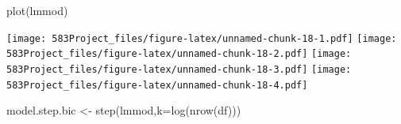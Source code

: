 \documentclass[
]{article}
\newenvironment{Shaded}{\begin{snugshade}}{\end{snugshade}}
\newcommand{\AttributeTok}[1]{\textcolor[rgb]{0.77,0.63,0.00}{#1}}
\newcommand{\FunctionTok}[1]{\textcolor[rgb]{0.00,0.00,0.00}{#1}}
\newcommand{\NormalTok}[1]{#1}
\newcommand{\OtherTok}[1]{\textcolor[rgb]{0.56,0.35,0.01}{#1}}
\begin{document}
\begin{Shaded}
\begin{Highlighting}[]
\FunctionTok{plot}\NormalTok{(lmmod)}
\end{Highlighting}
\end{Shaded}

\texttt{[image: 583Project\_files/figure-latex/unnamed-chunk-18-1.pdf]}
\texttt{[image: 583Project\_files/figure-latex/unnamed-chunk-18-2.pdf]}
\texttt{[image: 583Project\_files/figure-latex/unnamed-chunk-18-3.pdf]}
\texttt{[image: 583Project\_files/figure-latex/unnamed-chunk-18-4.pdf]}

\begin{Shaded}
\begin{Highlighting}[]
\NormalTok{model.step.bic }\OtherTok{\textless{}{-}} \FunctionTok{step}\NormalTok{(lmmod,}\AttributeTok{k=}\FunctionTok{log}\NormalTok{(}\FunctionTok{nrow}\NormalTok{(df)))}
\end{Highlighting}
\end{Shaded}
\end{document}

